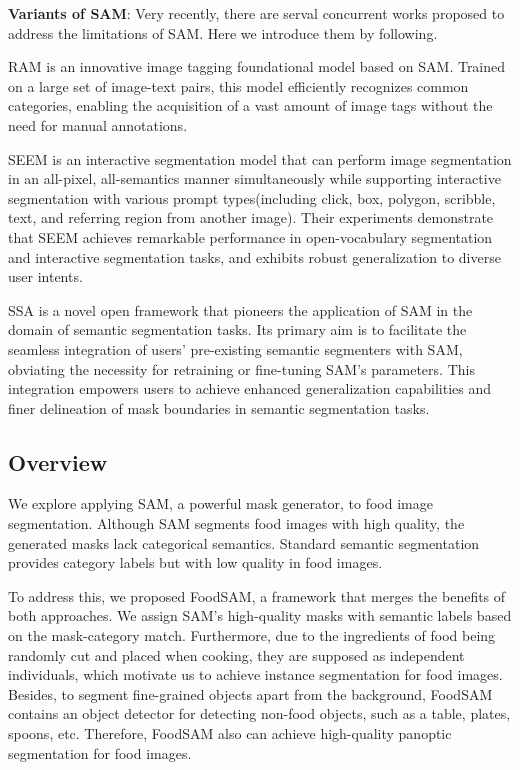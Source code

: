 \documentclass[lettersize,journal]{IEEEtran}
\begin{document}
\textbf{Variants of SAM}: 
Very recently, there are serval concurrent works proposed to address the limitations of SAM. Here we introduce them by following.

RAM \cite{zhang2023recognize} is an innovative image tagging foundational model based on SAM. Trained on a large set of image-text pairs, this model efficiently recognizes common categories, enabling the acquisition of a vast amount of image tags without the need for manual annotations.

SEEM \cite{zou2023segment} is an interactive segmentation model that can perform image segmentation in an all-pixel, all-semantics manner simultaneously while supporting interactive segmentation with various prompt types(including click, box, polygon, scribble, text, and referring region from another image). Their experiments demonstrate that SEEM achieves remarkable performance in open-vocabulary segmentation and interactive segmentation tasks, and exhibits robust generalization to diverse user intents.

SSA \cite{chen2023semantic} is a novel open framework that pioneers the application of SAM in the domain of semantic segmentation tasks. Its primary aim is to facilitate the seamless integration of users' pre-existing semantic segmenters with SAM, obviating the necessity for retraining or fine-tuning SAM's parameters. This integration empowers users to achieve enhanced generalization capabilities and finer delineation of mask boundaries in semantic segmentation tasks.

\subsection{Overview}
We explore applying SAM, a powerful mask generator, to food image segmentation. 
Although SAM segments food images with high quality, the generated masks lack categorical semantics. 
Standard semantic segmentation provides category labels but with low quality in food images. 

To address this, we proposed FoodSAM, a framework that merges the benefits of both approaches. 
We assign SAM's high-quality masks with semantic labels based on the mask-category match. 
Furthermore, due to the ingredients of food being randomly cut and placed when cooking, they are supposed as independent individuals,
which motivate us to achieve instance segmentation for food images.
Besides, to segment fine-grained objects apart from the background, FoodSAM contains an object detector for detecting non-food objects, such as a table, plates, spoons, etc. 
Therefore, FoodSAM also can achieve high-quality panoptic segmentation for food images.
\end{document}
